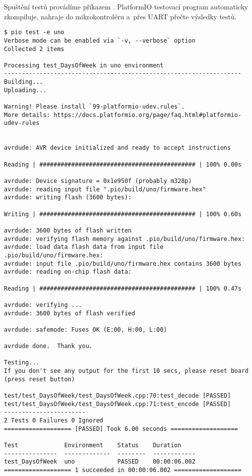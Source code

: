 Spuštění testů provádíme příkazem . PlatformIO testovací
program automaticky zkompiluje, nahraje do mikrokontroléru a~přes UART přečte
výsledky testů.
\begin{lstlisting}[style=terminal,columns=fixed]
$ pio test -e uno
Verbose mode can be enabled via `-v, --verbose` option
Collected 2 items

Processing test_DaysOfWeek in uno environment
-------------------------------------------------------------------
Building...
Uploading...

Warning! Please install `99-platformio-udev.rules`. 
More details: https://docs.platformio.org/page/faq.html#platformio-udev-rules


avrdude: AVR device initialized and ready to accept instructions

Reading | ############################################ | 100% 0.00s

avrdude: Device signature = 0x1e950f (probably m328p)
avrdude: reading input file ".pio/build/uno/firmware.hex"
avrdude: writing flash (3600 bytes):

Writing | ############################################ | 100% 0.60s

avrdude: 3600 bytes of flash written
avrdude: verifying flash memory against .pio/build/uno/firmware.hex:
avrdude: load data flash data from input file .pio/build/uno/firmware.hex:
avrdude: input file .pio/build/uno/firmware.hex contains 3600 bytes
avrdude: reading on-chip flash data:

Reading | ############################################ | 100% 0.47s

avrdude: verifying ...
avrdude: 3600 bytes of flash verified

avrdude: safemode: Fuses OK (E:00, H:00, L:00)

avrdude done.  Thank you.

Testing...
If you don't see any output for the first 10 secs, please reset board (press reset button)

test/test_DaysOfWeek/test_DaysOfWeek.cpp:70:test_decode	[PASSED]
test/test_DaysOfWeek/test_DaysOfWeek.cpp:71:test_encode	[PASSED]
-----------------------
2 Tests 0 Failures 0 Ignored
=================== [PASSED] Took 6.00 seconds ===================

Test             Environment    Status    Duration
---------------  -------------  --------  ------------
test_DaysOfWeek  uno            PASSED    00:00:06.002
=================== 1 succeeded in 00:00:06.002 ===================
\end{lstlisting}

